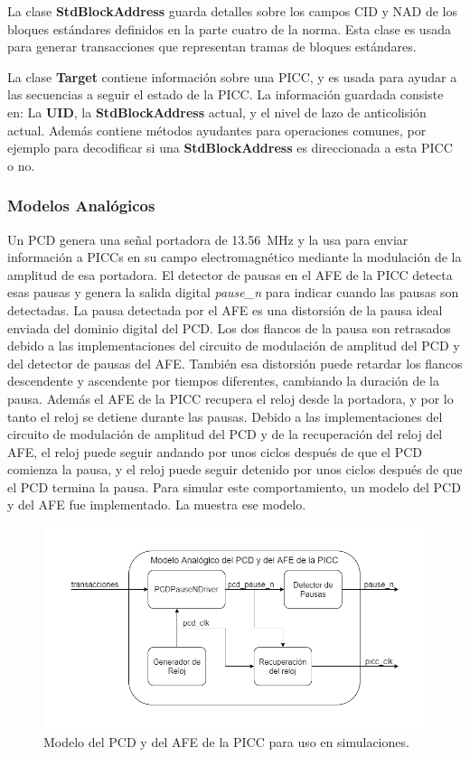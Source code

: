 \documentclass[a4paper, twoside, 11pt]{report}
\begin{document}
La clase \textbf{StdBlockAddress} guarda detalles sobre los campos CID y NAD de los bloques estándares definidos en la parte cuatro de la norma. Esta clase es usada para generar transacciones que representan tramas de bloques estándares.

La clase \textbf{Target} contiene información sobre una PICC, y es usada para ayudar a las secuencias a seguir el estado de la PICC. La información guardada consiste en: La \textbf{UID}, la \textbf{StdBlockAddress} actual, y el nivel de lazo de anticolisión actual. Además contiene métodos ayudantes para operaciones comunes, por ejemplo para decodificar si una \textbf{StdBlockAddress} es direccionada a esta PICC o no.

\FloatBarrier
\subsubsection{Modelos Analógicos}

Un PCD genera una señal portadora de \SI{13.56}{\mega\hertz} y la usa para enviar información a PICCs en su campo electromagnético mediante la modulación de la amplitud de esa portadora. El detector de pausas en el AFE de la PICC detecta esas pausas y genera la salida digital \textit{pause\_n} para indicar cuando las pausas son detectadas. La pausa detectada por el AFE es una distorsión de la pausa ideal enviada del dominio digital del PCD. Los dos flancos de la pausa son retrasados debido a las implementaciones del circuito de modulación de amplitud del PCD y del detector de pausas del AFE. También esa distorsión puede retardar los flancos descendente y ascendente por tiempos diferentes, cambiando la duración de la pausa. Además el AFE de la PICC recupera el reloj desde la portadora, y por lo tanto el reloj se detiene durante las pausas. Debido a las implementaciones del circuito de modulación de amplitud del PCD y de la recuperación del reloj del AFE, el reloj puede seguir andando por unos ciclos después de que el PCD comienza la pausa, y el reloj puede seguir detenido por unos ciclos después de que el PCD termina la pausa. Para simular este comportamiento, un modelo del PCD y del AFE fue implementado. La  muestra ese modelo.

\begin{figure}[htb]
  \centering
  \includegraphics[width=1.0\textwidth]{./img/analogue_model}
  \caption{Modelo del PCD y del AFE de la PICC para uso en simulaciones.}
  \label{fig:analog_model}
\end{figure}
\end{document}
